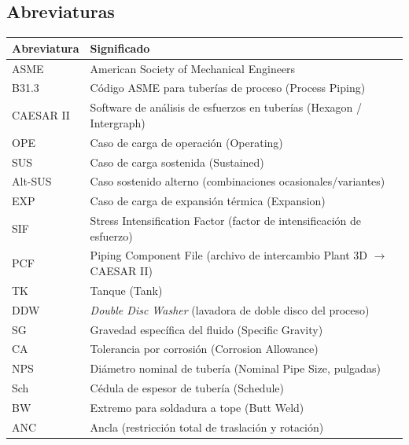 \vspace{1cm}

\subsection*{Abreviaturas}

\noindent\begin{tabularx}{\textwidth}{@{}l>{\raggedright\arraybackslash}X@{}}
	\toprule
	\textbf{Abreviatura} & \textbf{Significado} \\
	\midrule
	ASME & American Society of Mechanical Engineers \\
	B31.3 & C\'{o}digo ASME para tuber\'{i}as de proceso (Process Piping) \\
	CAESAR II & Software de an\'{a}lisis de esfuerzos en tuber\'{i}as (Hexagon / Intergraph) \\
	OPE & Caso de carga de operaci\'{o}n (Operating) \\
	SUS & Caso de carga sostenida (Sustained) \\
	Alt-SUS & Caso sostenido alterno (combinaciones ocasionales/variantes) \\
	EXP & Caso de carga de expansi\'{o}n t\'{e}rmica (Expansion) \\
	SIF & Stress Intensification Factor (factor de intensificaci\'{o}n de esfuerzo) \\
	PCF & Piping Component File (archivo de intercambio Plant 3D $\rightarrow$ CAESAR II) \\
	TK & Tanque (Tank) \\
	DDW & \textit{Double Disc Washer} (lavadora de doble disco del proceso) \\
	SG & Gravedad espec\'{i}fica del fluido (Specific Gravity) \\
	CA & Tolerancia por corrosi\'{o}n (Corrosion Allowance) \\
	NPS & Di\'{a}metro nominal de tuber\'{i}a (Nominal Pipe Size, pulgadas) \\
	Sch & C\'{e}dula de espesor de tuber\'{i}a (Schedule) \\
	BW & Extremo para soldadura a tope (Butt Weld) \\
	ANC & Ancla (restricci\'{o}n total de traslaci\'{o}n y rotaci\'{o}n) \\
	\bottomrule
\end{tabularx}

\newpage
